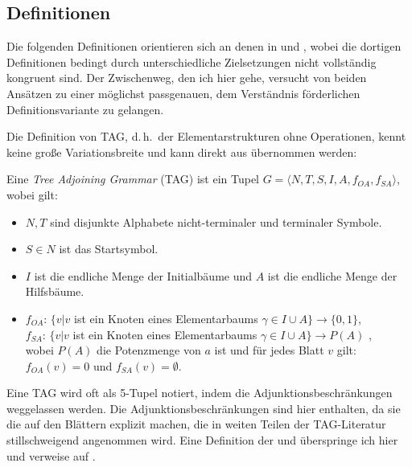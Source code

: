 \subsection{Definitionen}\label{sec-ttmctag-definitionen}

Die folgenden Definitionen orientieren sich an denen in \cite{Kallmeyer:05} und \cite{Kallmeyer:09}, wobei die dortigen Definitionen bedingt durch unterschiedliche Zielsetzungen nicht vollständig kongruent sind. Der Zwischenweg, den ich hier gehe, versucht von beiden Ansätzen zu einer möglichst passgenauen, dem Verständnis förderlichen Definitionsvariante zu gelangen. 

Die Definition von TAG, d.\,h.\ der Elementarstrukturen ohne Operationen, kennt keine gro\ss e Variationsbreite und kann direkt aus \cite{Kallmeyer:09} übernommen werden:   
\begin{definition}
Eine {\it Tree Adjoining Grammar} (TAG) ist ein Tupel $G = \langle N,T,S,I,A,f_{OA},f_{SA} \rangle$, wobei gilt:
\begin{itemize}
  \item $N,T$ sind disjunkte Alphabete nicht-terminaler und terminaler Symbole.
  \item $S \in N$ ist das Startsymbol.
  \item $I$ ist die endliche Menge der Initialbäume und $A$ ist die endliche Menge der Hilfsbäume.
  \item $f_{OA}$: $\{ v | v$ ist ein Knoten eines Elementarbaums $\gamma \in I \cup A \} \to \{0,1\}$, \\
        $f_{SA}$: $\{ v | v$ ist ein Knoten eines Elementarbaums $\gamma \in I \cup A \} \to P(A)$ ,\\
        wobei $P(A)$ die Potenzmenge von $a$ ist und für jedes Blatt $v$ gilt: $f_{OA}(v) = 0$ und $f_{SA}(v) = \emptyset$. 
\end{itemize}
\end{definition}
Eine TAG wird oft als 5-Tupel notiert, indem die Adjunktionsbeschränkungen weggelassen werden. Die Adjunktionsbeschränkungen sind hier enthalten, da sie die  auf den Blättern explizit machen, die in weiten Teilen der TAG-Literatur stillschweigend angenommen wird. Eine Definition der  und  überspringe ich hier und verweise auf \citet[59f]{Kallmeyer:09}.

